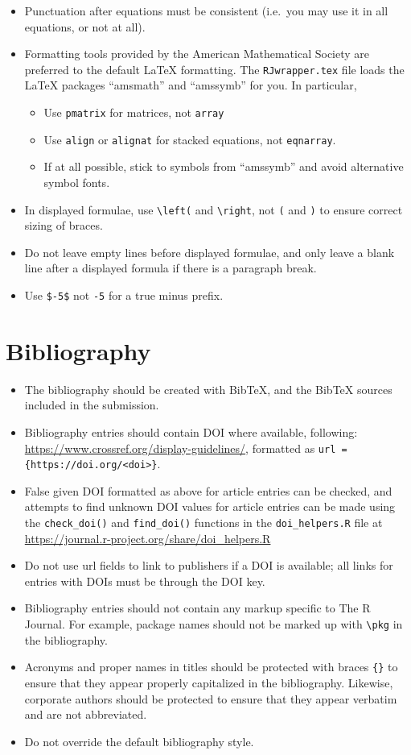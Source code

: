 \documentclass[11pt]{article}
\begin{document}
\begin{itemize}
\item Punctuation after equations must be consistent (i.e.\ you may
  use it in all equations, or not at all).
\item Formatting tools provided by the American Mathematical Society
  are preferred to the default LaTeX formatting. The
  \texttt{RJwrapper.tex} file loads the LaTeX packages ``amsmath'' and
  ``amssymb'' for you. In particular,
  \begin{itemize}
  \item Use \verb+pmatrix+ for matrices, not \verb+array+
  \item Use \verb+align+ or \verb+alignat+ for stacked equations,
    not \verb+eqnarray+.
  \item If at all possible, stick to symbols from ``amssymb'' and
    avoid alternative symbol fonts.
  \end{itemize}
\item In displayed formulae, use \verb+\left(+ and \verb+\right+, not
  \verb+(+ and \verb+)+ to ensure correct sizing of braces.
\item Do not leave empty lines before displayed formulae, and only
  leave a blank line after a displayed formula if there is a paragraph
  break.
\item Use \verb+$-5$+ not \verb+-5+ for a true minus prefix.
\end{itemize}

\section*{Bibliography}

\begin{itemize}
\item The bibliography should be created with BibTeX, and the BibTeX
  sources included in the submission.
\item Bibliography entries should contain DOI where available, following: \url{https://www.crossref.org/display-guidelines/}, formatted
  as \verb+url = {https://doi.org/<doi>}+.
\item False given DOI formatted as above for article entries can be checked, and attempts to find unknown DOI values for article entries can be made using the \verb+check_doi()+ and \verb+find_doi()+ functions in the \verb+doi_helpers.R+ file at \url{https://journal.r-project.org/share/doi\_helpers.R}
\item Do not use url fields to link to publishers if a DOI is available; all links for entries with DOIs must be through the DOI key.
\item Bibliography entries should not contain any markup specific to
  The R Journal. For example, package names should not be marked up
  with \verb+\pkg+ in the bibliography.
\item Acronyms and proper names in titles should be protected with
  braces \verb+{}+ to ensure that they appear properly capitalized
  in the bibliography. Likewise, corporate authors should be
  protected to ensure that they appear verbatim and are not abbreviated.
\item Do not override the default bibliography style.
\end{itemize}
\end{document}
